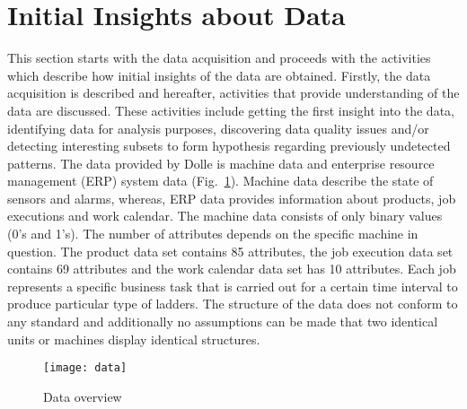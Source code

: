 \documentclass[runningheads]{llncs}
\begin{document}
\section{Initial Insights about Data}
\label{sec:dataunderstanding}
This section starts with the data acquisition and proceeds with the activities which describe how initial insights of the data are obtained. Firstly, the data acquisition is described and hereafter, activities that provide understanding of the data are discussed. These activities include getting the first insight into the data, identifying data for analysis purposes, discovering data quality issues and/or detecting interesting subsets to form hypothesis regarding previously undetected patterns. The data provided by Dolle is machine data and enterprise resource management (ERP) system data (Fig.~\ref{fig:data}). Machine data describe the state of sensors and alarms, whereas, ERP data provides information about products, job executions and work calendar. The machine data consists of only binary values (0's and 1's). The number of attributes depends on the specific machine in question. The product data set contains 85 attributes, the job execution data set contains 69 attributes and the work calendar data set has 10 attributes. Each job represents a specific business task that is carried out for a certain time interval to produce particular type of ladders. The structure of the data does not conform to any standard and additionally no assumptions can be made that two identical units or machines display identical structures. 

\begin{figure}
\centering
\texttt{[image: data]} 
 \vspace{-7mm}
\caption{Data overview}
\label{fig:data}
\end{figure}
\end{document}
